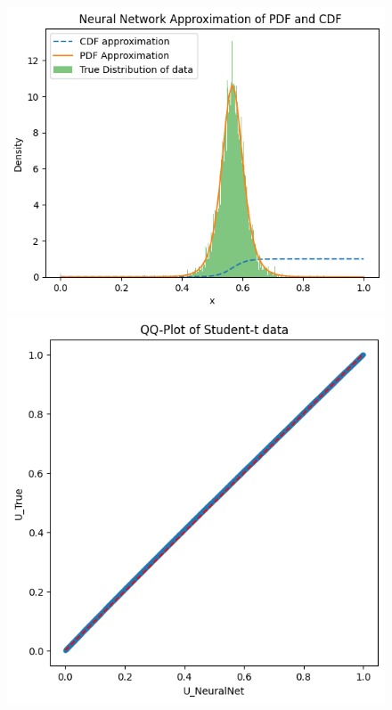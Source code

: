 \begin{figure}
\begin{minipage}{0.45\textwidth}
\begin{minipage}{0.48\textwidth}
        \end{minipage}
    \end{minipage}
    \hfill
    \begin{minipage}{0.45\textwidth}
        \centering
        \begin{minipage}{0.48\textwidth}
            \centering
            \includegraphics[width=\textwidth]{5ResultsDiscussion/pictures/MarginalTest/StudentsHistogram.png}
        \end{minipage}
        \hfill
        \begin{minipage}{0.48\textwidth}
            \centering
            \includegraphics[width=\textwidth]{5ResultsDiscussion/pictures/MarginalTest/StudentsQQ.png}

\end{minipage}
\end{minipage}
\end{figure}
